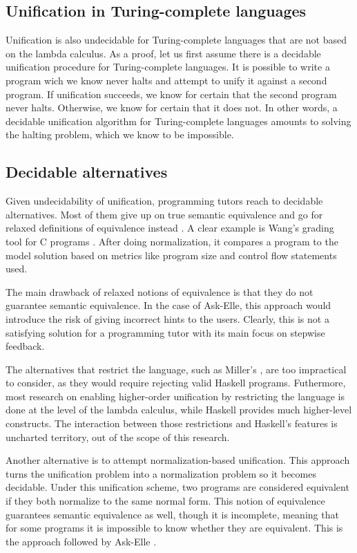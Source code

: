 \subsection{Unification in Turing-complete languages}

Unification is also undecidable for Turing-complete languages that are not based on the lambda calculus. As a proof, let us first assume there is a decidable unification procedure for Turing-complete languages. It is possible to write a program wich we know never halts and attempt to unify it against a second program. If unification succeeds, we know for certain that the second program never halts. Otherwise, we know for certain that it does not. In other words, a decidable unification algorithm for Turing-complete languages amounts to solving the halting problem, which we know to be impossible.

\subsection{Decidable alternatives}

Given undecidability of unification, programming tutors reach to decidable alternatives. Most of them give up on true semantic equivalence and go for relaxed definitions of equivalence instead \cite{2016feedbackreview}. A clear example is Wang's grading tool for C programs \cite{2007wang}. After doing normalization, it compares a program to the model solution based on metrics like program size and control flow statements used.

The main drawback of relaxed notions of equivalence is that they do not guarantee semantic equivalence. In the case of Ask-Elle, this approach would introduce the risk of giving incorrect hints to the users. Clearly, this is not a satisfying solution for a programming tutor with its main focus on stepwise feedback.

The alternatives that restrict the language, such as Miller's \cite{1991miller}, are too impractical to consider, as they would require rejecting valid Haskell programs. Futhermore, most research on enabling higher-order unification by restricting the language is done at the level of the lambda calculus, while Haskell provides much higher-level constructs. The interaction between those restrictions and Haskell's features is uncharted territory, out of the scope of this research.

Another alternative is to attempt normalization-based unification. This approach turns the unification problem into a normalization problem so it becomes decidable. Under this unification scheme, two programs are considered equivalent if they both normalize to the same normal form. This notion of equivalence guarantees semantic equivalence as well, though it is incomplete, meaning that for some programs it is impossible to know whether they are equivalent. This is the approach followed by Ask-Elle \cite{2010askelle}.


